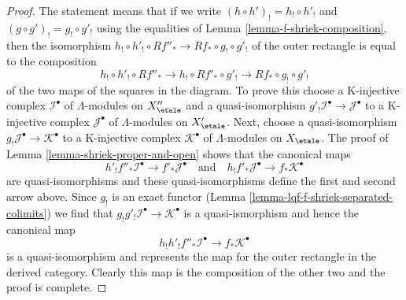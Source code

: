 \begin{proof}
The statement means that if we write
$(h \circ h')_! = h_! \circ h'_!$ and
$(g \circ g')_! = g_! \circ g'_!$
using the equalities of Lemma \ref{lemma-f-shriek-composition},
then the isomorphism
$h_! \circ h'_! \circ Rf''_* \to Rf_* \circ g_! \circ g'_!$
of the outer rectangle is equal to the composition
$$
h_! \circ h'_! \circ Rf''_* \to
h_! \circ Rf'_* \circ g'_! \to
Rf_* \circ g_! \circ g'_!
$$
of the two maps of the squares in the diagram. To prove this choose
a K-injective complex $\mathcal{I}^\bullet$ of $\Lambda$-modules
on $X''_\etale$ and a quasi-isomorphism
$g'_!\mathcal{I}^\bullet \to \mathcal{J}^\bullet$
to a K-injective complex $\mathcal{J}^\bullet$ of $\Lambda$-modules
on $X'_\etale$. Next, choose a quasi-isomorphism
$g_!\mathcal{J}^\bullet \to \mathcal{K}^\bullet$
to a K-injective complex $\mathcal{K}^\bullet$ of $\Lambda$-modules
on $X_\etale$.
The proof of Lemma \ref{lemma-shriek-proper-and-open} shows that the canonical
maps
$$
h'_!f''_*\mathcal{I}^\bullet \to f'_*\mathcal{J}^\bullet
\quad\text{and}\quad
h_!f'_*\mathcal{J}^\bullet \to f_*\mathcal{K}^\bullet
$$
are quasi-isomorphisms and these quasi-isomorphisms define the
first and second arrow above. Since $g_!$ is an exact functor
(Lemma \ref{lemma-lqf-f-shriek-separated-colimits})
we find that $g_!g'_!\mathcal{I}^\bullet \to \mathcal{K}^\bullet$
is a quasi-ismorphism and hence the canonical map
$$
h_!h'_!f''_*\mathcal{I}^\bullet \to f_*\mathcal{K}^\bullet
$$
is a quasi-isomorphism and represents the map for the outer
rectangle in the derived category. Clearly this map is the
composition of the other two and the proof is complete.
\end{proof}

